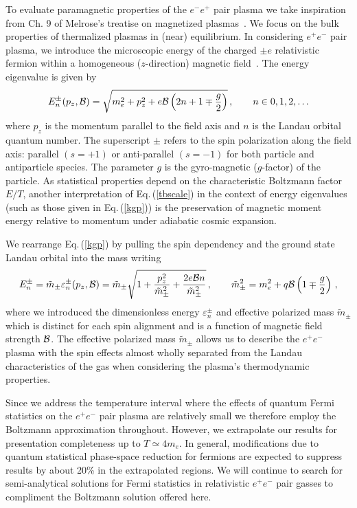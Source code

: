 \documentclass[a4paper]{article}
\newcommand{\req}[1]{Eq.\,(\ref{#1})}
\newcommand*{\xblue}{\color{black}}
\begin{document}
To evaluate paramagnetic properties of the $e^-e^+$ pair plasma we take inspiration from Ch. 9 of Melrose's treatise on magnetized plasmas~\cite{melrose2008quantum}. We focus  on the bulk properties of thermalized plasmas in (near) equilibrium. In considering $e^{+}e^{-}$ pair plasma, we introduce the microscopic energy of the charged $\pm e$ relativistic fermion within a homogeneous ($z$-direction) magnetic field~\cite{steinmetz2018magnetic}. The energy eigenvalue is given by
\begin{align}
    \label{kgp}
    E^{\pm}_{n}(p_{z},{\cal B})=\sqrt{m_{e}^{2}+p_{z}^{2}+e{\cal B}\left(2n+1\mp\frac{g}{2}\right)}\,,\qquad n\in0,1,2,\ldots
\end{align}
where $p_{z}$ is the momentum parallel to the field axis and $n$ is the Landau orbital quantum number. The {\xblue superscript} $\pm$ refers to the spin polarization along the field axis: parallel $(s=+1)$ or anti-parallel $(s=-1)$ {\xblue for both particle and antiparticle species.} The parameter $g$ is the gyro-magnetic ($g$-factor) of the particle. As statistical properties depend on the characteristic Boltzmann factor $E/T$, another interpretation of \req{tbscale} in the context of energy eigenvalues (such as those given in \req{kgp}) is the preservation of magnetic moment energy relative to momentum under adiabatic cosmic expansion.

We rearrange \req{kgp} by pulling the spin dependency and the ground state Landau orbital into the mass writing
\begin{align}
    \label{effmass}
    E^{\pm}_{n}={\tilde m}_{\pm}\varepsilon_{n}^{\pm}(p_{z},{\cal B})={\tilde m}_{\pm}\sqrt{1+\frac{p_{z}^{2}}{{\tilde m}_{\pm}^{2}}+\frac{2e{\cal B}n}{{\tilde m}_{\pm}^{2}}}\,,\qquad {\tilde m}_{\pm}^{2}=m_{e}^{2}+q{\cal B}\left(1\mp\frac{g}{2}\right)\,,
\end{align}
where we introduced the {\xblue dimensionless energy $\varepsilon^{\pm}_{n}$ and} effective polarized mass ${\tilde m}_{\pm}$ which is distinct for each spin alignment and is a function of magnetic field strength ${\cal B}$. The effective polarized mass ${\tilde m}_{\pm}$ allows us to describe the $e^{+}e^{-}$ plasma with the spin effects almost wholly separated from the Landau characteristics of the gas when considering the plasma's thermodynamic properties.

Since {\xblue we address} the temperature interval where {\xblue the effects of quantum Fermi statistics on the $e^{+}e^{-}$ pair plasma} are relatively small we therefore employ the Boltzmann approximation throughout. However, we extrapolate our results for presentation completeness up to $T\simeq 4m_{e}$. In general, modifications due to quantum statistical phase-space reduction for fermions are expected to {\xblue suppress results} by about 20\% {\xblue in the extrapolated regions}. We will continue to search for semi-analytical solutions for Fermi statistics in relativistic $e^{+}e^{-}$ pair gasses {\xblue to compliment the} Boltzmann solution offered here. 
\end{document}
